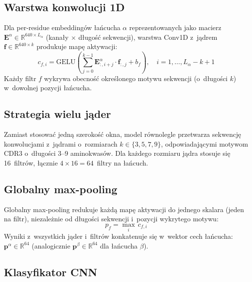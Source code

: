 \documentclass{SGGW-thesis}
\begin{document}
\subsection{Warstwa konwolucji 1D}

Dla per-residue embeddingów łańcucha $\alpha$ reprezentowanych jako macierz
$\mathbf{E}^\alpha \in \mathbb{R}^{640 \times L_\alpha}$ (kanały $\times$ długość sekwencji),
warstwa Conv1D z~jądrem $\mathbf{f} \in \mathbb{R}^{640 \times k}$ produkuje mapę aktywacji:
\begin{equation}
    c_{f,i} = \mathrm{GELU}\!\left(\sum_{j=0}^{k-1} \mathbf{E}^\alpha_{:,i+j} \cdot \mathbf{f}_{:,j} + b_f\right), \quad i = 1, \ldots, L_\alpha - k + 1
    \label{eq:conv1d}
\end{equation}
Każdy filtr $f$ wykrywa obecność określonego motywu sekwencji (o~długości $k$) w~dowolnej
pozycji łańcucha.

\subsection{Strategia wielu jąder}

Zamiast stosować jedną szerokość okna, model równolegle przetwarza sekwencję konwolucjami z~jądrami
o~rozmiarach $k \in \{3, 5, 7, 9\}$, odpowiadającymi motywom CDR3 o~długości 3--9 aminokwasów.
Dla każdego rozmiaru jądra stosuje się 16~filtrów, łącznie $4 \times 16 = 64$~filtry na
łańcuch.

\subsection{Globalny max-pooling}

Globalny max-pooling redukuje każdą mapę aktywacji do jednego skalara (jeden na filtr), niezależnie
od długości sekwencji i~pozycji wykrytego motywu:
\begin{equation}
    p_f = \max_{i}\, c_{f,i}
    \label{eq:maxpool}
\end{equation}
Wyniki z~wszystkich jąder i~filtrów konkatenuje się w~wektor cech łańcucha:
$\mathbf{p}^\alpha \in \mathbb{R}^{64}$ (analogicznie $\mathbf{p}^\beta \in \mathbb{R}^{64}$
dla łańcucha $\beta$).

\subsection{Klasyfikator CNN}
\end{document}
